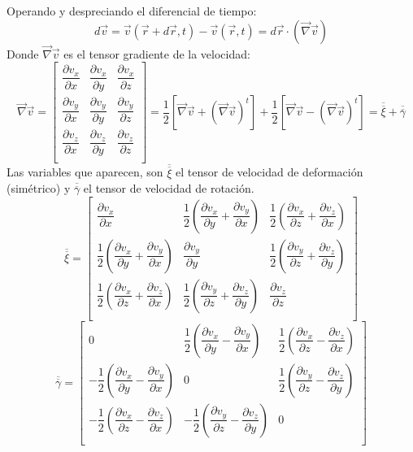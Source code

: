 Operando y despreciando el diferencial de tiempo:
\[d\vec{v}=\vec{v}(\vec{r}+d\vec{r},t)-\vec{v}(\vec r ,t)=d\vec{r}\cdot(\vec{\nabla}\vec{v})\]
Donde $\vec{\nabla}\vec{v}$ es el tensor gradiente de la velocidad:
\setlength{\arraycolsep}{1.5pt}
\renewcommand{\arraystretch}{2}
\[\vec{\nabla}\vec{v}=\begin{bmatrix}
	\dfrac{\partial v_x}{\partial x} & \dfrac{\partial v_x}{\partial y} & \dfrac{\partial v_x}{\partial z} \\
	\dfrac{\partial v_y}{\partial x} & \dfrac{\partial v_y}{\partial y} & \dfrac{\partial v_y}{\partial z} \\
	\dfrac{\partial v_z}{\partial x} & \dfrac{\partial v_z}{\partial y} & \dfrac{\partial v_z}{\partial z} \\
\end{bmatrix}=\dfrac{1}{2}\left[\vec{\nabla}\vec{v}+\left(\vec{\nabla}\vec{v}\right)^t\right]+\dfrac{1}{2}\left[\vec{\nabla}\vec{v}-\left(\vec{\nabla}\vec{v}\right)^t\right]=\overline{\overline{\xi}}+\overline{\overline{\gamma}}\]
Las variables que aparecen, son $\overline{\overline{\xi}}$ el tensor de velocidad de deformación (simétrico) y $\overline{\overline{\gamma}}$ el tensor de velocidad de rotación.
\newpage
\setlength{\arraycolsep}{1.5pt}
\renewcommand{\arraystretch}{2}
\[\overline{\overline{\xi}}=\begin{bmatrix}
	\dfrac{\partial v_x}{\partial x} & \dfrac{1}{2}\left(\dfrac{\partial v_x}{\partial y}+\dfrac{\partial v_y}{\partial x}\right) & \dfrac{1}{2}\left(\dfrac{\partial v_x}{\partial z}+\dfrac{\partial v_z}{\partial x}\right) \\
	\dfrac{1}{2}\left(\dfrac{\partial v_x}{\partial y}+\dfrac{\partial v_y}{\partial x}\right) & \dfrac{\partial v_y}{\partial y} & \dfrac{1}{2}\left(\dfrac{\partial v_y}{\partial z} +\dfrac{\partial v_z}{\partial y}\right) \\
	\dfrac{1}{2}\left(\dfrac{\partial v_x}{\partial z}+\dfrac{\partial v_z}{\partial x}\right) & \dfrac{1}{2}\left(\dfrac{\partial v_y}{\partial z} +\dfrac{\partial v_z}{\partial y}\right) & \dfrac{\partial v_z}{\partial z} \\
\end{bmatrix}\]
\setlength{\arraycolsep}{1.5pt}
\renewcommand{\arraystretch}{2}
\[\overline{\overline{\gamma}}=\begin{bmatrix}
0 & \dfrac{1}{2}\left(\dfrac{\partial v_x}{\partial y}-\dfrac{\partial v_y}{\partial x}\right) & \dfrac{1}{2}\left(\dfrac{\partial v_x}{\partial z}-\dfrac{\partial v_z}{\partial x}\right) \\

	-\dfrac{1}{2}\left(\dfrac{\partial v_x}{\partial y}-\dfrac{\partial v_y}{\partial x}\right) & 0 & \dfrac{1}{2}\left(\dfrac{\partial v_y}{\partial z} -\dfrac{\partial v_z}{\partial y}\right) \\
	
	-\dfrac{1}{2}\left(\dfrac{\partial v_x}{\partial z}-\dfrac{\partial v_z}{\partial x}\right) & -\dfrac{1}{2}\left(\dfrac{\partial v_y}{\partial z} -\dfrac{\partial v_z}{\partial y}\right) & 0 \\
\end{bmatrix}\]
